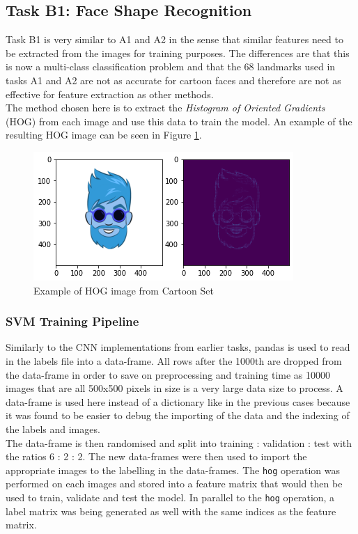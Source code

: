 \documentclass{article}
\begin{document}
    \subsection{Task B1: Face Shape Recognition}
    Task B1 is very similar to A1 and A2 in the sense that similar features need to be extracted from the images for training purposes. The differences are that this is now a multi-class classification problem and that the 68 landmarks used in tasks A1 and A2 are not as accurate for cartoon faces and therefore are not as effective for feature extraction as other methods.\\
    
    The method chosen here is to extract the \textit{Histogram of Oriented Gradients} (HOG) from each image and use this data to train the model. An example of the resulting HOG image can be seen in Figure \ref{fig:hog}.
    \begin{figure}[htb]
    	\centering
    	\includegraphics[scale=0.7]{Figures/Hog_Example.PNG}
    	\caption{Example of HOG image from Cartoon Set}
    	\label{fig:hog}
    \end{figure} 
    
    \subsubsection{SVM Training Pipeline}
    Similarly to the CNN implementations from earlier tasks, pandas is used to read in the labels file into a data-frame. All rows after the 1000th are dropped from the data-frame in order to save on preprocessing and training time as 10000 images that are all 500x500 pixels in size is a very large data size to process. A data-frame is used here instead of a dictionary like in the previous cases because it was found to be easier to debug the importing of the data and the indexing of the labels and images.\\
    
    The data-frame is then randomised and split into training : validation : test with the ratios 6 : 2 : 2. The new data-frames were then used to import the appropriate images to the labelling in the data-frames. The \verb|hog| operation was performed on each images and stored into a feature matrix that would then be used to train, validate and test the model. In parallel to the \verb|hog| operation, a label matrix was being generated as well with the same indices as the feature matrix.\\
    
\end{document}
